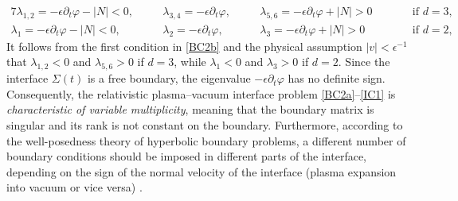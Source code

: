 \documentclass[twoside,11pt]{article}
\numberwithin{equation}{section}
\def\p{\partial}
\begin{document}
	\begin{alignat*}{7}	
 \lambda_{1,2} =-\epsilon\p_t\varphi-|N|<0,\quad
&&\lambda_{3,4} = -\epsilon\p_t\varphi,\quad
&& \lambda_{5,6} = -\epsilon\p_t\varphi+|N|>0\qquad  &&\textrm{if }d=3,\\[1mm]
 \lambda_{1} = -\epsilon\p_t\varphi-|N|<0,\quad
&&\lambda_{2} = -\epsilon\p_t\varphi,\quad
&&\lambda_{3} = -\epsilon\p_t\varphi+|N|>0\qquad &&\textrm{if }d=2,
\end{alignat*}	
\fi
{It follows from the first condition in \eqref{BC2b} and the physical assumption $|v|<\epsilon^{-1}$ that $\lambda_{1,2}<0$ and $\lambda_{5,6}>0$ if $d=3$, while $\lambda_{1}<0$ and $\lambda_{3}>0$ if $d=2$.}
Since the interface $\Sigma(t)$ is a free boundary,  the eigenvalue $-\epsilon\p_t\varphi$ has no definite sign.
Consequently,
{the relativistic plasma--vacuum interface problem \eqref{BC2a}--\eqref{IC1} is {\it characteristic of variable multiplicity}, meaning that the boundary matrix is singular and its rank is not constant on the boundary.}
Furthermore, according to the well-posedness theory of hyperbolic boundary problems, a different number of boundary conditions should be imposed in different parts of the interface, depending on the sign of the normal velocity of the interface (plasma expansion into vacuum or vice versa)%
.

 
	
\end{document}
